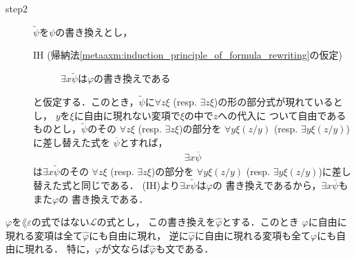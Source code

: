 \begin{metaprf}
\begin{description}
\begin{description}
					\item[step2]
						$\widetilde{\psi}$を$\psi$の書き換えとし，
						\begin{description}
							\item[IH (帰納法\ref{metaaxm:induction_principle_of_formula_rewriting}の仮定)]
								$\exists x \widetilde{\psi}$は$\varphi$の書き換えである
						\end{description}
						と仮定する．このとき，$\widetilde{\psi}$に$\forall z \xi$ 
						(resp. $\exists z \xi$)の形の部分式が現れているとし，
						$y$を$\xi$に自由に現れない変項で$\xi$の中で$z$への代入に
						ついて自由であるものとし，$\widetilde{\psi}$のその
						$\forall z \xi$ (resp. $\exists z \xi$)の部分を
						$\forall y \xi(z/y)$
						(resp. $\exists y \xi(z/y)$)に差し替えた式を
						$\overline{\psi}$とすれば，
						\begin{align}
							\exists x \overline{\psi}
						\end{align}
						は$\exists x \widetilde{\psi}$のその
						$\forall z \xi$ (resp. $\exists z \xi$)の部分を
						$\forall y \xi(z/y)$
						(resp. $\exists y \xi(z/y)$)に差し替えた式と同じである．
						(IH)より$\exists x \widetilde{\psi}$は$\varphi$の
						書き換えであるから，$\exists x \overline{\psi}$もまた$\varphi$の
						書き換えである．
						\QED
				\end{description}
		\end{description}
	\end{metaprf}
	
	\begin{screen}
		\begin{metathm}[書き換えによって自由な変項は増減しない]
		\label{metathm:variables_unchanged_after_rewriting}
			$\varphi$を$\lang{\varepsilon}$の式ではない$\mathcal{L}$の式とし，
			この書き換えを$\widehat{\varphi}$とする．このとき
			$\varphi$に自由に現れる変項は全て$\widehat{\varphi}$にも自由に現れ，
			逆に$\widehat{\varphi}$に自由に現れる変項も全て$\varphi$にも自由に現れる．
			特に，$\varphi$が文ならば$\widehat{\varphi}$も文である．
		\end{metathm}
	\end{screen}
	
